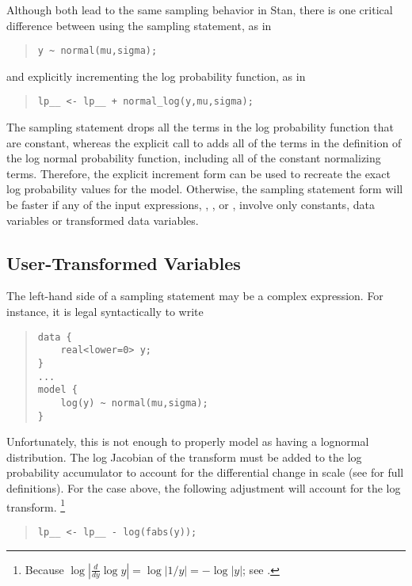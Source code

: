 Although both lead to the same sampling behavior in Stan, there is one
critical difference between using the sampling statement, as in
%
\begin{quote}
\begin{Verbatim}[fontsize=\small]
y ~ normal(mu,sigma);
\end{Verbatim}
\end{quote}
%
and explicitly incrementing the log probability function, as in
%
\begin{quote}
\begin{Verbatim}[fontsize=\small]
lp__ <- lp__ + normal_log(y,mu,sigma);
\end{Verbatim}
\end{quote}
%
The sampling statement drops all the terms in the log probability
function that are constant, whereas the explicit call to
 adds all of the terms in the definition of the log
normal probability function, including all of the constant normalizing
terms.  Therefore, the explicit increment form can be used to recreate
the exact log probability values for the model.  Otherwise, the
sampling statement form will be faster if any of the input expressions,
, , or , involve only constants, data
variables or transformed data variables. 


\subsection{User-Transformed Variables}

The left-hand side of a sampling statement may be a complex
expression.  For instance, it is legal syntactically to write
%
\begin{quote}
\begin{Verbatim}[fontsize=\small]
data {
    real<lower=0> y;
}
...
model {
    log(y) ~ normal(mu,sigma);
}
\end{Verbatim}
\end{quote}
%
Unfortunately, this is not enough to properly model  as having
a lognormal distribution.  The log Jacobian of the transform must be
added to the log probability accumulator to account for the
differential change in scale (see  for
full definitions).  For the case above, the following adjustment will
account for the log transform.%
%
\footnote{Because $\log | \frac{d}{dy} \log y | = \log | 1/y | = - \log
  |y|$;  see .}
%
\begin{quote}
\begin{Verbatim}[fontsize=\small]
lp__ <- lp__ - log(fabs(y));
\end{Verbatim}
\end{quote}
%

